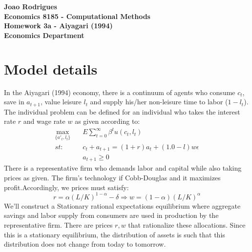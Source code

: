 \documentclass{article} %
\begin{document}
\begin{center}
  \textbf{Joao Rodrigues} \\
  \textbf{Economics 8185 - Computational Methods} \\
  \textbf{Homework 3a - Aiyagari (1994)} \\
  \textbf{Economics Department}
\end{center}
\section*{Model details}
In the Aiyagari (1994) economy, there is a continuum of agents who consume $c_t$, save in $a_{t+1}$, value leisure $l_t$ and supply his/her non-leisure time to labor ($1-l_{t}$). The individual problem can be defined for an individual who takes the interest rate $r$ and wage rate $w$ as given according to:
\begin{align*}
  \max_{\{a'_t, l_t\}} & \quad  E\sum_{t=0}^{\infty} \beta^t u(c_t,l_t)    \\
  st:     & \quad c_t + a_{t+1} = (1+r)a_{t} + (1.0-l)w\epsilon   \\
           & \quad a_{t+1} \geq 0
\end{align*}
There is a representative firm who demands labor and capital while also taking prices as given. The firm's technology if Cobb-Douglas and it maximizes profit.Accordingly, we prices must satisfy: 
$$r = \alpha (L/K)^{1-\alpha} - \delta \Rightarrow w = (1-\alpha)(L/K)^{\alpha} $$
We'll construct a Stationary rational expectations equilibrium where aggregate savings and labor supply from consumers are used in production by the representative firm. There are prices $r,w$ that rationalize these allocations. Since this is a stationary equilibrium, the distribution of assets is such that this distribution does not change from today to tomorrow.
\end{document}
